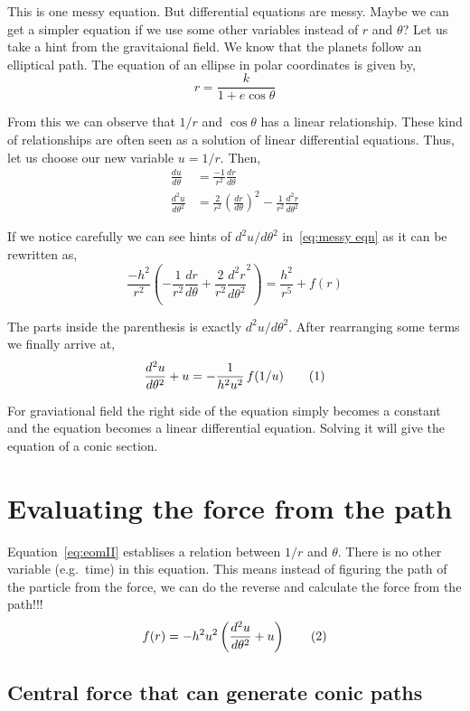 \documentclass[a4paper, 12pt]{article}
\renewcommand{\indent}{\hspace{3ex}}
\newcommand\labelthis[1]{\addtocounter{equation}{1}\tag{\theequation}\label{#1}}
\newcommand{\ddth}[1]{\frac{d#1}{d\theta}}
\newcommand{\ddthII}[1]{\frac{d^2#1}{d\theta^2}}
\begin{document}
\medskip
This is one messy equation. But differential equations are messy. Maybe we can get a simpler equation if we use some other variables instead of $r$ and $\theta$?
Let us take a hint from the gravitaional field. We know that the planets follow an elliptical path.  The equation of an ellipse in polar coordinates is given by,
\[ r = \frac{k}{1 + e \cos{\theta}} \]

From this we can observe that $1/r$ and $\cos{\theta}$ has a linear relationship. These kind of relationships are often seen as a solution of linear differential equations. Thus, let us choose our new variable $u = 1/r$. Then,
\begin{align*}
	\ddth{u} 	&= \frac{-1}{r^2} \ddth{r} \\
	\ddthII{u}  &= \frac{2}{r^2} {\left( \ddth{r} \right)}^2 - \frac{1}{r^2} \ddthII{r}
\end{align*}

If we notice carefully we can see hints of ${d^2 u}/{{d\theta}^2}$ in~\eqref{eq:messy eqn} as it can be rewritten as,
\[ \frac{-h^2}{r^2} \left( - \frac{1}{r^2} \ddth{r} + \frac{2}{r^2} \ddthII{r}^2 \right)
	= \frac{h^2}{r^5} + f(r) \]

	The parts inside the parenthesis is exactly ${d^2 u}/{{d\theta}^2}$. After rearranging some terms we finally arrive at,
\[ \ddthII{u} + u = - \frac{1}{h^2 u^2} \, f(1/u) \labelthis{eq:eomII} \]

For graviational field the right side of the equation simply becomes a constant and the equation becomes a linear differential equation. Solving it will give the equation of a conic section.

\section{Evaluating the force from the path}\label{force from path}

\indent Equation~\eqref{eq:eomII} establises a relation between $1/r$ and $\theta$. There is no other variable (e.g.\ time) in this equation. This means instead of figuring the path of the particle from the force, we can do the reverse and calculate the force from the path!!!
\[ f(r) = - h^2 u^2 \left( \ddthII{u} + u \right) \labelthis{eq:force from path} \]

\subsection{Central force that can generate conic paths}\label{force for conics}
\end{document}
